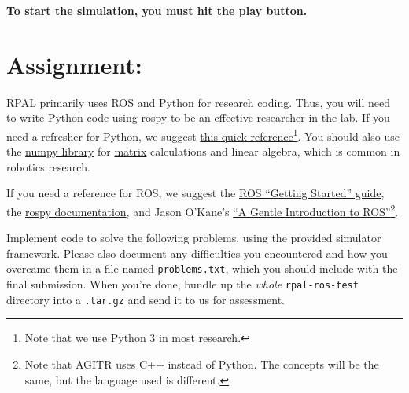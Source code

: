 \documentclass[11pt]{article}
\begin{document}
\textbf{To start the simulation, you must hit the play button.}

\section{Assignment:}

RPAL primarily uses ROS and Python for research coding. Thus, you will need to write Python code
using \href{http://wiki.ros.org/rospy}{rospy} to be an effective researcher in the lab. If you need
a refresher for Python, we suggest \href{https://learnxinyminutes.com/docs/python/}{this quick
reference}\footnote{Note that we use Python 3 in most research.}. You should also use the
\href{http://www.numpy.org/}{numpy library} for
\href{https://docs.scipy.org/doc/numpy-1.14.0/reference/generated/numpy.matrix.html}{matrix}
calculations and linear algebra, which is common in robotics research.

If you need a reference for ROS, we suggest the \href{http://wiki.ros.org/ROS/StartGuide}{ROS
``Getting Started'' guide}, the \href{http://wiki.ros.org/rospy}{rospy documentation}, and Jason
O'Kane's \href{https://cse.sc.edu/~jokane/agitr/agitr-letter.pdf}{``A Gentle Introduction to
ROS''}\footnote{Note that AGITR uses C++ instead of Python. The concepts will be the same, but the
language used is different.}.

Implement code to solve the following problems, using the provided simulator framework. Please also
document any difficulties you encountered and how you overcame them in a file named
\texttt{problems.txt}, which you should include with the final submission. When you're done, bundle
up the \emph{whole} \texttt{rpal-ros-test} directory into a \texttt{.tar.gz} and send it to us for
assessment.
\end{document}

